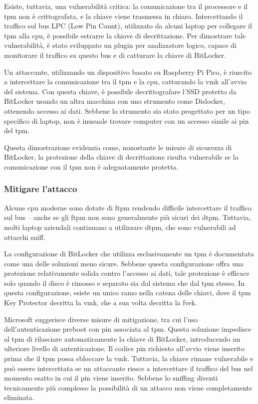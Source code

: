Esiste, tuttavia, una vulnerabilità critica: la comunicazione tra il processore e il \acrshort{tpm} non è crittografata, e la chiave viene trasmessa in chiaro. Intercettando il traffico sul bus LPC (Low Pin Count), utilizzato da alcuni laptop per collegare il \acrshort{tpm} alla \acrshort{cpu}, è possibile estrarre la chiave di decrittazione. Per dimostrare tale vulnerabilità, è stato sviluppato un plugin per analizzatore logico, capace di monitorare il traffico su questo bus e di catturare la chiave di BitLocker.

Un attaccante, utilizzando un dispositivo basato su Raspberry Pi Pico, è riuscito a intercettare la comunicazione tra il \acrshort{tpm} e la \acrshort{cpu}, catturando la \acrshort{vmk} all'avvio del sistema. Con questa chiave, è possibile decrittografare l'SSD protetto da BitLocker usando un altra macchina con uno strumento come Dislocker, ottenendo accesso ai dati. Sebbene lo strumento sia stato progettato per un tipo specifico di laptop, non è inusuale trovare computer con un accesso simile ai pin del \acrshort{tpm}.

Questa dimostrazione evidenzia come, nonostante le misure di sicurezza di BitLocker, la protezione della chiave di decrittazione risulta vulnerabile se la comunicazione con il \acrshort{tpm} non è adeguatamente protetta.

\subsubsection{Mitigare l’attacco}\label{subsubsec:mitigare_attacco}

Alcune \acrshort{cpu} moderne sono dotate di f\acrshort{tpm} rendendo difficile intercettare il traffico sul bus -- anche se gli f\acrshort{tpm} non sono generalmente più sicuri dei d\acrshort{tpm}. Tuttavia, molti laptop aziendali continuano a utilizzare d\acrshort{tpm}, che sono vulnerabili ad attacchi sniff.

La configurazione di BitLocker che utilizza esclusivamente un \acrshort{tpm} è documentata come una delle soluzioni meno sicure. Sebbene questa configurazione offra una protezione relativamente solida contro l'accesso ai dati, tale protezione è efficace solo quando il disco è rimosso e separato sia dal sistema che dal \acrshort{tpm} stesso. In questa configurazione, esiste un unico ramo nella catena delle chiavi, dove il \acrshort{tpm} Key Protector decritta la \acrshort{vmk}, che a sua volta decritta la \acrshort{fvek}.

Microsoft suggerisce diverse misure di mitigazione, tra cui l'uso dell'autenticazione preboot con \acrshort{pin} associata al \acrshort{tpm}. Questa soluzione impedisce al \acrshort{tpm} di rilasciare automaticamente la chiave di BitLocker, introducendo un ulteriore livello di autenticazione. Il codice \acrshort{pin} richiesto all'avvio viene inserito prima che il \acrshort{tpm} possa sbloccare la \acrshort{vmk}. Tuttavia, la chiave rimane vulnerabile e può essere intercettata se un attaccante riesce a intercettare il traffico del bus nel momento esatto in cui il \acrshort{pin} viene inserito. Sebbene lo sniffing diventi tecnicamente più complesso la possibilità di un attacco non viene completamente eliminata.